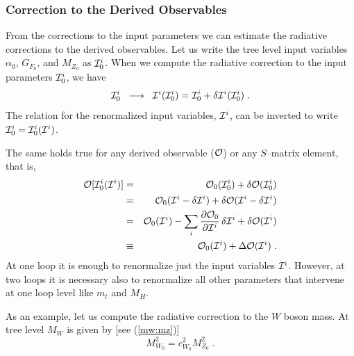 \documentclass[12pt]{report}
\newcommand{\del}{\partial}
\begin{document}
\subsubsection{Correction to the Derived Observables} \indent

From the corrections to the input parameters we can estimate the
radiative corrections to the derived observables. Let us write the
tree level input variables $\alpha_0$, $G_{F_0}$, and $M_{Z_0}$ as
${\cal I}_0^i$. When we compute the radiative correction to the input
parameters ${\cal I}_0^i$, we have
\[
{\cal I}_0^i \;\; \longrightarrow \;\; {\cal I}^i ({\cal I}_0^i) = 
{\cal I}_0^i + \delta {\cal I}^i ({\cal I}_0^i) \; .
\]
The relation for the renormalized input variables, ${\cal I}^i$,  can
be inverted to write $ {\cal I}_0^i = {\cal I}_0^i ({\cal I}^i)$. 

The same holds true for any derived observable (${\cal O}$) or any
$S$--matrix element, that is,
\begin{eqnarray}
{\cal O}[{\cal I}^i_0 ({\cal I}^i)] &=& 
{\cal O}_0({\cal I}^i_0) + \delta {\cal O}({\cal I}^i_0) \nonumber\\
&=& {\cal O}_0({\cal I}^i - \delta {\cal I}^i) + \delta {\cal O}({\cal I}^i 
- \delta {\cal I}^i) \nonumber \\
&=&  {\cal O}_0({\cal I}^i)  - 
\sum_i \frac{\del {\cal O}_0}{\del {\cal I}^i} \, \delta {\cal I}^i 
+ \delta {\cal O}({\cal I}^i)
\nonumber \\
&\equiv&  {\cal O}_0({\cal I}^i) + \Delta {\cal O}({\cal I}^i) \; .
\label{cor:obs}
\end{eqnarray}
At one loop it is enough to renormalize just the input variables
${\cal I}^i$. However, at two loops it is necessary also to
renormalize all other parameters that intervene at one loop level
like $m_t$ and $M_H$.

As an example, let us compute the radiative correction to the $W$
boson mass. At tree level $M_W$ is given by [see (\ref{mw:mz})]
\[
M_{W_0}^2 =  c_{W_0}^2 M_{Z_0}^2 \; .
\]
\end{document}
